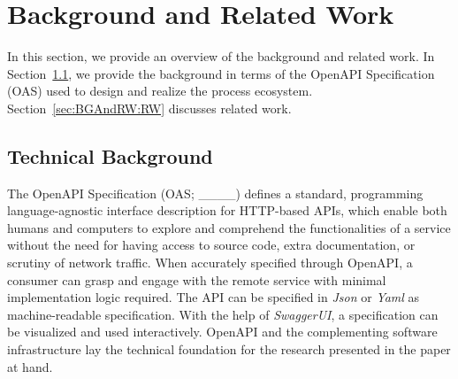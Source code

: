 \section{Background and Related Work}
\label{sec:BGAndRW}
In this section, we provide an overview of the background and related work. In Section~\ref{sec:BGAndRW:BG}, we provide the background in terms of the OpenAPI Specification (OAS) used to design and realize the process ecosystem. Section~\ref{sec:BGAndRW:RW} discusses related work.

\subsection{Technical Background}
\label{sec:BGAndRW:BG}
The OpenAPI Specification (OAS; ____) defines a standard, programming language-agnostic interface description for HTTP-based APIs, which enable both humans and computers to explore and comprehend the functionalities of a service without the need for having access to source code, extra documentation, or scrutiny of network traffic. When accurately specified through OpenAPI, a consumer can grasp and engage with the remote service with minimal implementation logic required. The API can be specified in \emph{Json} or \emph{Yaml} as machine-readable specification. With the help of \emph{SwaggerUI}, a specification can be visualized and used interactively. OpenAPI and the complementing software infrastructure lay the technical foundation for the research presented in the paper at hand.

